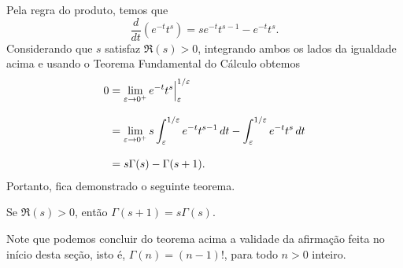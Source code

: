     Pela regra do produto, temos que
    $$\frac{d}{dt}(e^{-t}t^{s}) = se^{-t}t^{s-1} - e^{-t}t^{s}.$$
    Considerando que $s$ satisfaz $\Re(s)>0$, integrando ambos os lados da igualdade acima e usando o Teorema Fundamental do Cálculo obtemos
    \begin{align*}
        0 
        &= 
        \lim_{\varepsilon \to 0^+} e^{-t}t^s \Big|_{\varepsilon}^{1/\varepsilon} 
        \\[0.3cm]
        &= 
        \lim_{\varepsilon \to 0^+} s\int_{\varepsilon}^{1/\varepsilon} e^{-t}t^{s-1} \, dt - \int_{\varepsilon}^{1/\varepsilon} e^{-t}t^{s} \, dt 
        \\[0.3cm]
        &= 
        s\Gamma(s) - \Gamma(s+1).
    \end{align*}
    Portanto, fica demonstrado o seguinte teorema.
    
    \begin{teorema}\label{teo-eq-func-Gama}
    Se $\Re(s)>0$, então $\Gamma(s+1) = s\Gamma(s)$.
    \end{teorema}

    Note que podemos concluir do teorema 
    acima a validade da afirmação feita 
    no início desta seção, isto é, 
    $\Gamma(n) = (n-1)!$, 
    para todo $n > 0$ inteiro. 
    
